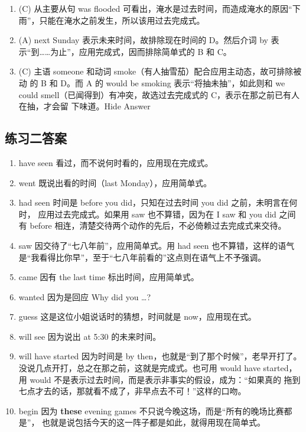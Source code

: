 \begin{enumerate}
\item (C) 从主要从句 was flooded 可看出，淹水是过去时间，而造成淹水的原因“下雨”，只能在淹水之前发生，所以该用过去完成式。

\item (A) next Sunday 表示未来时间，故排除现在时间的 D。然后介词 by 表示“到……为止”，应用完成式，因而排除简单式的 B 和 C。

\item (C) 主语 someone 和动词 smoke（有人抽雪茄）配合应用主动态，故可排除被动
  的 B 和 D。而 A 的 would be smoking 表示“将抽未抽”，如此则和 we could
  smell（已闻得到）有冲突，故选过去完成式的 C，表示在那之前已有人在抽，才会留
  下味道。Hide Answer

\end{enumerate}

\subsection{练习二答案}

\begin{enumerate}
\item have seen 看过，而不说何时看的，应用现在完成式。

\item went 既说出看的时间（last Monday），应用简单式。

\item had seen 时间是 before you did，只知在过去时间 you did 之前，未明言在何时，
  应用过去完成式。如果用 saw 也不算错，因为在 I saw 和 you did 之间有 before
  相连，清楚交待两个动作的先后，不必倚赖过去完成式来交待。

\item saw 因交待了“七八年前”，应用简单式。用 had seen 也不算错，这样的语气
  是“我看得比你早”，至于“七八年前看的”这点则在语气上不予强调。

\item came 因有 the last time 标出时间，应用简单式。

\item wanted 因为是回应 Why did you \ldots ?

\item guess 这是这位小姐说话时的猜想，时间就是 now，应用现在式。

\item will see 因为说出 at 5:30 的未来时间。

\item will have started 因为时间是 by then，也就是“到了那个时候”，老早开打了。
  没说几点开打，总之在那之前，这就是完成式。也可用 would have
  started，用 would 不是表示过去时间，而是表示非事实的假设，成为：“如果真的
  拖到七点才去的话，那就看不成了，非早点去不可！”这样的口吻。

\item begin 因为 \textbf{these} evening games 不只说今晚这场，而是“所有的晚场比赛都是”，
  也就是说包括今天的这一阵子都是如此，就得用现在简单式。
\end{enumerate}

